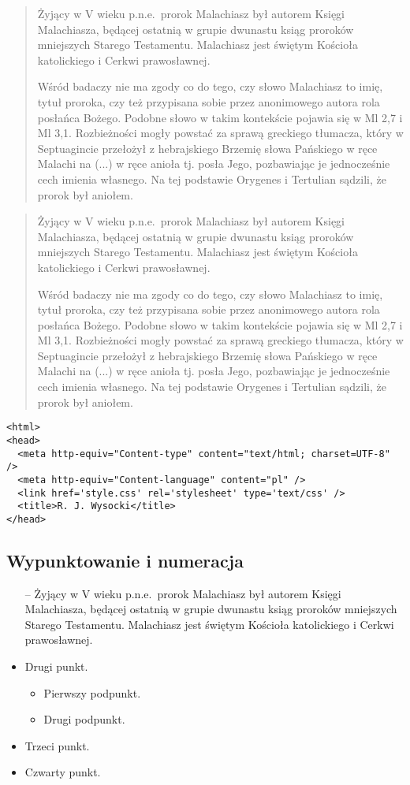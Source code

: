 \documentclass[12pt,a4paper]{article}
\begin{document}
\begin{quote}
Żyjący w V wieku p.n.e.~prorok Malachiasz był autorem Księgi Malachiasza, będącej
ostatnią w grupie dwunastu ksiąg proroków mniejszych Starego Testamentu. Malachiasz jest
świętym Kościoła katolickiego i Cerkwi prawosławnej.

Wśród badaczy nie ma zgody co do
tego, czy słowo Malachiasz to imię, tytuł proroka, czy też przypisana sobie przez
anonimowego autora rola posłańca Bożego. Podobne słowo w takim kontekście pojawia
się w Ml 2,7 i Ml 3,1. Rozbieżności mogły powstać za sprawą greckiego tłumacza, który
w Septuagincie przełożył z hebrajskiego Brzemię słowa Pańskiego w ręce Malachi na
(...) w ręce anioła tj. posła Jego, pozbawiając je jednocześnie cech
imienia własnego. Na tej podstawie Orygenes i Tertulian sądzili, że prorok był aniołem.
\end{quote}

\begin{quotation}
Żyjący w V wieku p.n.e.~prorok Malachiasz był autorem Księgi Malachiasza, będącej
ostatnią w grupie dwunastu ksiąg proroków mniejszych Starego Testamentu. Malachiasz jest
świętym Kościoła katolickiego i Cerkwi prawosławnej.

Wśród badaczy nie ma zgody co do
tego, czy słowo Malachiasz to imię, tytuł proroka, czy też przypisana sobie przez
anonimowego autora rola posłańca Bożego. Podobne słowo w takim kontekście pojawia
się w Ml 2,7 i Ml 3,1. Rozbieżności mogły powstać za sprawą greckiego tłumacza, który
w Septuagincie przełożył z hebrajskiego Brzemię słowa Pańskiego w ręce Malachi na
(...) w ręce anioła tj. posła Jego, pozbawiając je jednocześnie cech
imienia własnego. Na tej podstawie Orygenes i Tertulian sądzili, że prorok był aniołem.
\end{quotation}

{\footnotesize
\begin{verbatim}
<html>
<head>
  <meta http-equiv="Content-type" content="text/html; charset=UTF-8" />
  <meta http-equiv="Content-language" content="pl" />
  <link href='style.css' rel='stylesheet' type='text/css' />
  <title>R. J. Wysocki</title>
</head>
\end{verbatim}
}

\subsection{Wypunktowanie i numeracja}

\begin{itemize}
\item[--] Żyjący w V wieku p.n.e.~prorok Malachiasz był autorem Księgi Malachiasza, będącej
  ostatnią w grupie dwunastu ksiąg proroków mniejszych Starego Testamentu. Malachiasz jest
  świętym Kościoła katolickiego i Cerkwi prawosławnej.
\item Drugi punkt.
  \begin{itemize}
  \item Pierwszy podpunkt.
  \item Drugi podpunkt.
  \end{itemize}
\item Trzeci punkt.
\item Czwarty punkt.
\end{itemize}
\end{document}
